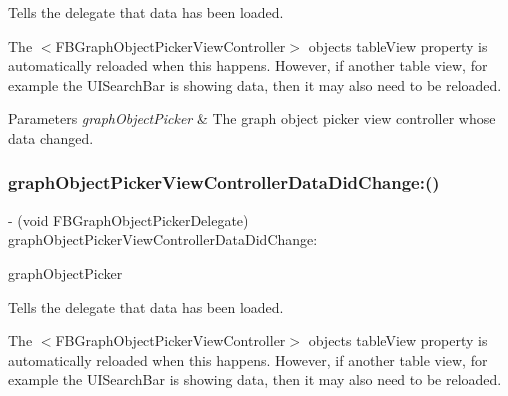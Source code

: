 Tells the delegate that data has been loaded.

The $<$\+F\+B\+Graph\+Object\+Picker\+View\+Controller$>$ object\textquotesingle{}s {\ttfamily table\+View} property is automatically reloaded when this happens. However, if another table view, for example the {\ttfamily U\+I\+Search\+Bar} is showing data, then it may also need to be reloaded.


\begin{DoxyParams}{Parameters}
{\em graph\+Object\+Picker} & The graph object picker view controller whose data changed. \\
\hline
\end{DoxyParams}
\mbox{\label{protocolFBGraphObjectPickerDelegate_01-p_a7444276f3c20567235206a1be36074cb}} 
\subsubsection{\texorpdfstring{graph\+Object\+Picker\+View\+Controller\+Data\+Did\+Change\+:()}{graphObjectPickerViewControllerDataDidChange:()}\hspace{0.1cm}{\footnotesize\ttfamily [4/5]}}
{\footnotesize\ttfamily -\/ (void F\+B\+Graph\+Object\+Picker\+Delegate) graph\+Object\+Picker\+View\+Controller\+Data\+Did\+Change\+: \begin{DoxyParamCaption}\item[{(\hyperlink{interfaceFBGraphObjectPickerViewController}{F\+B\+Graph\+Object\+Picker\+View\+Controller} $\ast$)}]{graph\+Object\+Picker }\end{DoxyParamCaption}\hspace{0.3cm}{\ttfamily [optional]}}

Tells the delegate that data has been loaded.

The $<$\+F\+B\+Graph\+Object\+Picker\+View\+Controller$>$ object\textquotesingle{}s {\ttfamily table\+View} property is automatically reloaded when this happens. However, if another table view, for example the {\ttfamily U\+I\+Search\+Bar} is showing data, then it may also need to be reloaded.


